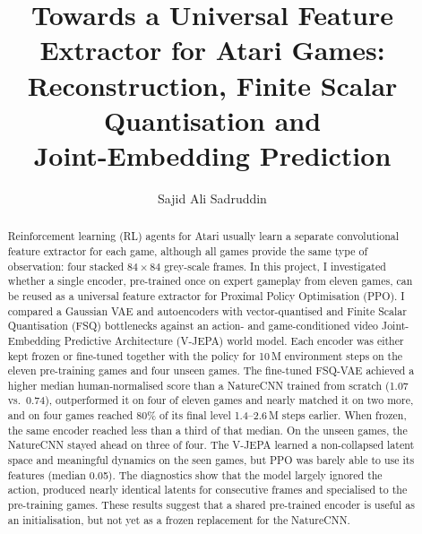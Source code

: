 \documentclass[runningheads]{llncs}
\begin{document}
\title{Towards a Universal Feature Extractor for Atari Games:\\
Reconstruction, Finite Scalar Quantisation and\\ Joint-Embedding Prediction}

\author{Sajid Ali Sadruddin}

\maketitle

\begin{abstract}
Reinforcement learning (RL) agents for Atari usually learn a separate convolutional feature
extractor for each game, although all games provide the same type of observation: four
stacked $84\times84$ grey-scale frames. In this project, I investigated whether a single
encoder, pre-trained once on expert gameplay from eleven games, can be reused as a universal
feature extractor for Proximal Policy Optimisation (PPO). I compared a Gaussian VAE and
autoencoders with vector-quantised and Finite Scalar Quantisation (FSQ) bottlenecks against an
action- and game-conditioned video Joint-Embedding Predictive Architecture (V-JEPA) world model. Each
encoder was either kept frozen or fine-tuned together with the policy for 10\,M environment
steps on the eleven pre-training games and four unseen games. The fine-tuned FSQ-VAE achieved a
higher median human-normalised score than a NatureCNN trained from scratch (1.07 vs.\ 0.74),
outperformed it on four of eleven games and nearly matched it on two more, and on four games
reached 80\% of its final level 1.4--2.6\,M steps earlier. When frozen, the same encoder
reached less than a third of that median. On the unseen games, the NatureCNN stayed ahead on
three of four. The V-JEPA
learned a non-collapsed latent space and meaningful dynamics on the seen games, but PPO was
barely able to use its features (median 0.05). The diagnostics show that the model largely
ignored the action, produced nearly identical latents for consecutive frames and specialised
to the pre-training games. These results suggest that a shared pre-trained encoder is useful
as an initialisation, but not yet as a frozen replacement for the NatureCNN.
\end{abstract}
\end{document}
